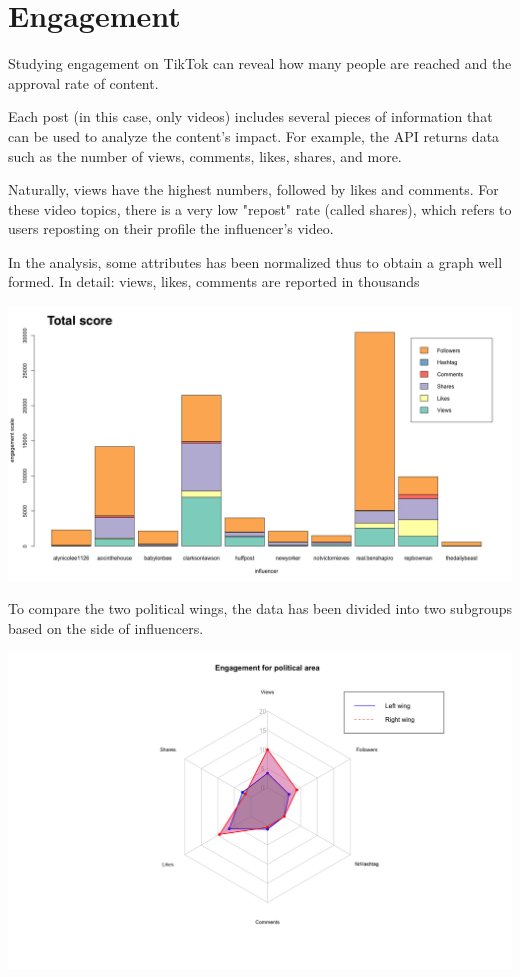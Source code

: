 \section{Engagement}

Studying engagement on TikTok can reveal how many people are reached and the approval rate of content.

Each post (in this case, only videos) includes several pieces of information that can be used to analyze the content's impact. For example, the API returns data such as the number of views, comments, likes, shares, and more.

Naturally, views have the highest numbers, followed by likes and comments. For these video topics, there is a very low "repost" rate (called shares), which refers to users reposting on their profile the influencer’s video.

In the analysis, some attributes has been normalized thus to obtain a graph well formed.
In detail: views, likes, comments are reported in thousands

\includegraphics[width = .48\textwidth]{images/Final_Engagement_TotalScore.png}

To compare the two political wings, the data has been divided into two subgroups based on the side of influencers.

\includegraphics[width = .48\textwidth]{images/Final_Engagement_EngegementPerArea.png}